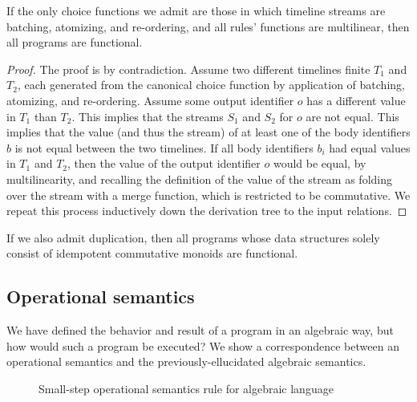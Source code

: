 \begin{theorem}[Confluence]
If the only choice functions we admit are those in which timeline streams are batching, atomizing, and re-ordering, and all rules' functions are multilinear, then all programs are functional.
\end{theorem}

\begin{proof}
The proof is by contradiction.  Assume two different timelines finite $T_1$ and $T_2$, each generated from the canonical choice function by application of batching, atomizing, and re-ordering.  Assume some output identifier $o$ has a different value in $T_1$ than $T_2$.  This implies that the streams $S_1$ and $S_2$ for $o$ are not equal.  This implies that the value (and thus the stream) of at least one of the body identifiers $b$ is not equal between the two timelines.  If all body identifiers $b_i$ had equal values in $T_1$ and $T_2$, then the value of the output identifier $o$ would be equal, by multilinearity, and recalling the definition of the value of the stream as folding over the stream with a merge function, which is restricted to be commutative.  We repeat this process inductively down the derivation tree to the input relations.
\end{proof}

\begin{corollary}
If we also admit duplication, then all programs whose data structures solely consist of idempotent commutative monoids are functional.
\end{corollary}


\subsection{Operational semantics}

We have defined the behavior and result of a program in an algebraic way, but how would such a program be executed?  We show a correspondence between an operational semantics and the previously-ellucidated algebraic semantics.

\begin{figure*}
\label{fig:opsem}
\begin{prooftree}
\end{prooftree}
\caption{Small-step operational semantics rule for algebraic language}
\end{figure*}

